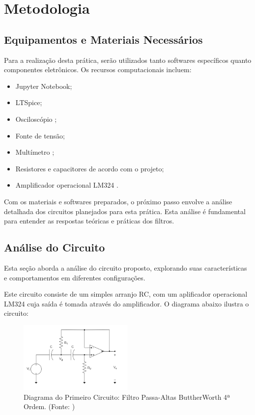 \documentclass[
	12pt,				%
	openright,			%
	twoside,			%
	a4paper,			%
	english,			%
	french,				%
	spanish,			%
	brazil,				%
	]{abntex2}
\begin{document}
\clearpage
\chapter{Metodologia}

\section{Equipamentos e Materiais Necessários}
Para a realização desta prática, serão utilizados tanto softwares específicos quanto componentes eletrônicos. Os recursos computacionais incluem:
\begin{itemize}
    \item Jupyter Notebook;
    \item LTSpice;
    \item Osciloscópio \cite{keysight_manual};
    \item Fonte de tensão;
    \item Multímetro \cite{keysight-u1250};
    \item Resistores e capacitores de acordo com o projeto;
    \item Amplificador operacional LM324 \cite{lm324_datasheet}.
\end{itemize}

Com os materiais e softwares preparados, o próximo passo envolve a análise detalhada dos circuitos planejados para esta prática. Esta análise é fundamental para entender as respostas teóricas e práticas dos filtros.

\section{Análise do Circuito}
Esta seção aborda a análise do circuito proposto, explorando suas características e comportamentos em diferentes configurações.

Este circuito consiste de um simples arranjo RC, com um aplificador operacional LM324 \cite{lm324_datasheet} cuja saída é tomada através do amplificador. O diagrama abaixo ilustra o circuito:

\begin{figure}[H]
\centering
\includegraphics[width=0.5\textwidth]{imgs/filtro_bw.png}
\caption{Diagrama do Primeiro Circuito: Filtro Passa-Altas ButtherWorth 4ª Ordem. (Fonte: \cite{ufpe2023pratica})}
\label{fig:first_circuit_analysis}
\end{figure}
\end{document}
